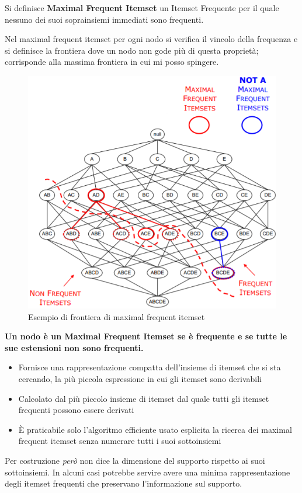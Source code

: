\begin{defn}
	Si definisce \textbf{Maximal Frequent Itemset} un Itemset Frequente per il quale nessuno dei suoi soprainsiemi immediati sono frequenti.
\end{defn}
Nel maximal frequent itemset per ogni nodo si verifica il vincolo della frequenza e si definisce la frontiera dove un nodo non gode più di questa proprietà;  corrisponde alla massima frontiera in cui mi posso spingere.

\begin{figure}[H]
	\centering
	\includegraphics[height=0.7 \linewidth]{association/pict/max_freq_itemset.png}
	\caption{Esempio di frontiera di maximal frequent itemset}
\end{figure}
\textbf{ Un nodo è un Maximal Frequent Itemset se è frequente e se tutte le sue estensioni non sono frequenti.}


\begin{itemize}
	\item Fornisce una rappresentazione compatta dell'insieme di itemset che si sta cercando, la più piccola espressione in cui gli itemset sono derivabili
	\item Calcolato dal più piccolo insieme di itemset dal quale tutti gli itemset frequenti possono essere derivati
	\item È praticabile solo l'algoritmo efficiente usato esplicita la ricerca dei maximal frequent itemset senza numerare tutti i suoi sottoinsiemi
\end{itemize}
Per costruzione \textit{però} non dice la dimensione del supporto rispetto ai suoi sottoinsiemi. In alcuni casi potrebbe servire avere una minima rappresentazione degli itemset frequenti che preservano l'informazione sul supporto.

